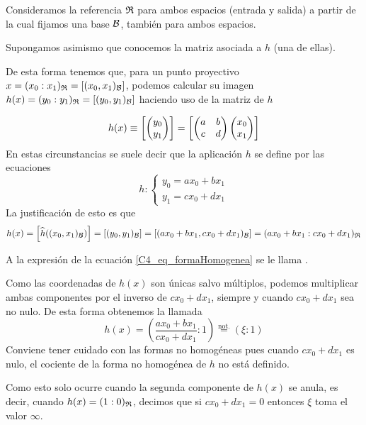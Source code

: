 Consideramos la referencia $\mathfrak{R}$ para ambos espacios (entrada y salida) a partir de la cual fijamos una base $\mathcal{B}$, también para ambos espacios.

Supongamos asimismo que conocemos la matriz asociada a $h$ (una de ellas).

De esta forma tenemos que, para un punto proyectivo $x=(x_0:x_1)_{\mathfrak{R}}=\left [ (x_0,x_1)_{\mathcal{B}} \right ]$, podemos calcular su imagen $h(x)=(y_0:y_1)_{\mathfrak{R}}=\left [ (y_0,y_1)_{\mathcal{B}} \right ]$ haciendo uso de la matriz de $h$

\[h(x)\equiv\left [ \begin{pmatrix}
	y_0 \\ y_1
	\end{pmatrix} \right ]=\left [ \begin{pmatrix}
	a & b\\
	c & d
	\end{pmatrix}\begin{pmatrix}
	x_0\\
	x_1
\end{pmatrix} \right ]\]
En estas circunstancias se suele decir que la aplicación $h$ se define por las ecuaciones
\begin{equation}
\label{C4_eq_formaHomogenea}
h:\left\{\begin{array}{l}
y_0 = ax_0+bx_1\\
y_1 = cx_0+dx_1
\end{array}\right.\end{equation}
La justificación de esto es que \[h(x)=\left [ \widehat{h}((x_0,x_1)_{\mathcal{B}}) \right ]=\left [ (y_0,y_1)_{\mathcal{B}} \right ]=\left [ (ax_0+bx_1,cx_0+dx_1)_{\mathcal{B}} \right ]=(ax_0+bx_1:cx_0+dx_1)_{\mathfrak{R}}\]

A la expresión de la ecuación \eqref{C4_eq_formaHomogenea} se le llama .

Como las coordenadas de $h(x)$ son únicas salvo múltiplos, podemos multiplicar ambas componentes por el inverso de $cx_0+dx_1$, siempre y cuando $cx_0+dx_1$ sea no nulo. De esta forma obtenemos la llamada 
\[h(x)=\left(\frac{ax_0+bx_1}{cx_0+dx_1}:1\right)\stackrel{\mathrm{not.}}{=}(\xi:1)\]
Conviene tener cuidado con las formas no homogéneas pues cuando $cx_0+dx_1$ es nulo, el cociente de la forma no homogénea de $h$ no está definido.

Como esto solo ocurre cuando la segunda componente de $h(x)$ se anula, es decir, cuando $h(x)=(1:0)_{\mathfrak{R}}$, decimos que si $cx_0+dx_1=0$ entonces $\xi$ toma el valor $\infty$.

